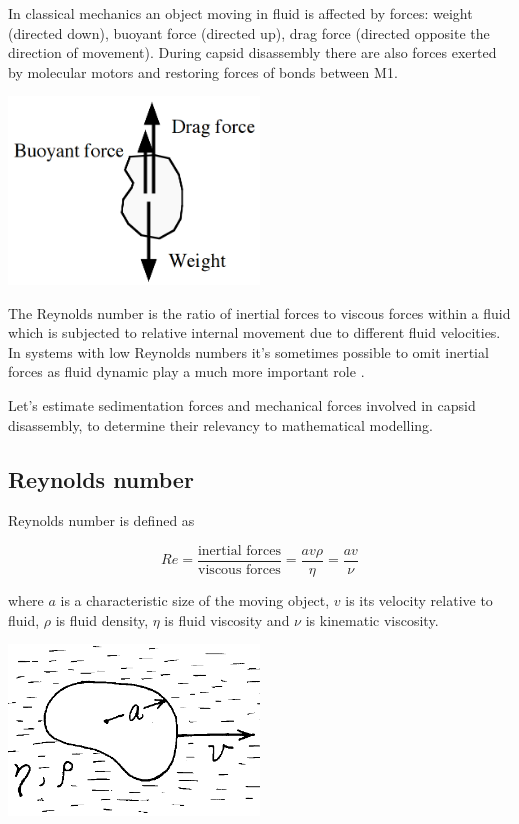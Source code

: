 In classical mechanics an object moving in fluid is affected by forces: weight (directed down), buoyant force (directed up), drag force (directed opposite the direction of movement). During capsid disassembly there are also forces exerted by molecular motors and restoring forces of bonds between M1.

\begin{center}
\includegraphics[width=0.5\textwidth]{D_chapters/1_TugOfWar/Sedimentation.PNG}
\end{center}

The Reynolds number is the ratio of inertial forces to viscous forces within a fluid which is subjected to relative internal movement due to different fluid velocities. In systems with low Reynolds numbers it's sometimes possible to omit inertial forces as fluid dynamic play a much more important role \cite{purcell1977life}.

Let's estimate sedimentation forces and mechanical forces involved in capsid disassembly, to determine their relevancy to mathematical modelling.

\subsection{Reynolds number}

Reynolds number is defined as

\begin{equation}
Re = \frac{\text{inertial forces}}{\text{viscous forces}} =\frac{av\rho}{\eta} = \frac{av}{\nu}
\end{equation}

where $a$ is a characteristic size of the moving object, $v$ is its velocity relative to fluid, $\rho$ is fluid density, $\eta$ is fluid viscosity and $\nu$ is kinematic viscosity.

\begin{center}
\includegraphics[width=0.5\textwidth]{D_chapters/1_TugOfWar/Reynolds_number.PNG}
\end{center}

